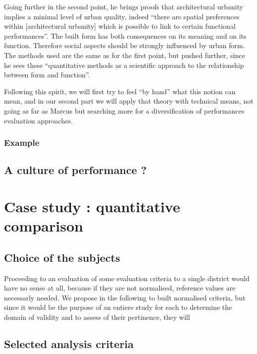 \documentclass[english]{article}
\begin{document}
\bigskip{}


Going further in the second point, he brings proofs that architectural
urbanity implies a minimal level of urban quality, indeed ``there
are spatial preferences within {[}architectural urbanity{]} which
is possible to link to certain functional performances''. The built
form has both consequences on its meaning and on its function. Therefore
social aspects should be strongly influenced by urban form. The methods
used are the same as for the first point, but pushed further, since
he sees these ``quantitative methods as a scientific approach to
the relationship between form and function''.

\bigskip{}


Following this spirit, we will first try to feel ``by hand'' what
this notion can mean, and in our second part we will apply that theory
with technical means, not going as far as Marcus but searching more
for a diversification of performances evaluation approaches.


\subsubsection{Example}


\subsection{A culture of performance ?}


\section{Case study : quantitative comparison}


\subsection{Choice of the subjects}

Proceeding to an evaluation of some evaluation criteria to a single
district would have no sense at all, because if they are not normalised,
reference values are necessarly needed. We propose in the following
to built normalised criteria, but since it would be the purpose of
an entiere study for each to determine the domain of validity and
to assess of their pertinence, they will


\subsection{Selected analysis criteria}
\end{document}
